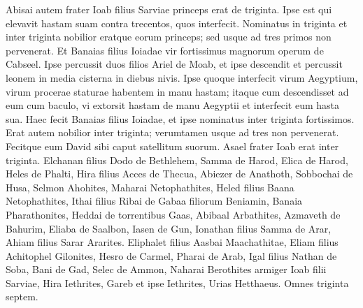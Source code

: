 \begin{biblechapter}
\begin{biblechapter}
\begin{biblechapter}
\begin{biblechapter}
\begin{biblechapter}
\begin{biblechapter}
\begin{biblechapter}
\begin{biblechapter}
\begin{biblechapter}
\begin{biblechapter}
\begin{biblechapter}
\begin{biblechapter}
\begin{biblechapter}
\begin{biblechapter}
\begin{biblechapter}
\begin{biblechapter}
\begin{biblechapter}
\begin{biblechapter}
\begin{biblechapter}
\begin{biblechapter}
\begin{biblechapter}
\begin{biblechapter}
\begin{biblechapter}
 \verse Abisai autem frater Ioab filius Sarviae princeps erat de triginta. Ipse est qui elevavit hastam suam contra trecentos, quos interfecit. Nominatus in triginta 
\verse et inter triginta nobilior eratque eorum princeps; sed usque ad tres primos non pervenerat.
 \verse Et Banaias filius Ioiadae vir fortissimus magnorum operum de Cabseel. Ipse percussit duos filios Ariel de Moab, et ipse descendit et percussit leonem in media cisterna in diebus nivis. 
\verse Ipse quoque interfecit virum Aegyptium, virum procerae staturae habentem in manu hastam; itaque cum descendisset ad eum cum baculo, vi extorsit hastam de manu Aegyptii et interfecit eum hasta sua. 
 \verse Haec fecit Banaias filius Ioiadae, et ipse nominatus inter triginta fortissimos. 
\verse Erat autem nobilior inter triginta; verumtamen usque ad tres non pervenerat. Fecitque eum David sibi caput satellitum suorum.
 \verse Asael frater Ioab erat inter triginta. Elchanan filius Dodo de Bethlehem, 
 \verse Samma de Harod, Elica de Harod, 
\verse Heles de Phalti, Hira filius Acces de Thecua, 
\verse Abiezer de Anathoth, Sobbochai de Husa, 
\verse Selmon Ahohites, Maharai Netophathites, 
\verse Heled filius Baana Netophathites, Ithai filius Ribai de Gabaa filiorum Beniamin, 
\verse Banaia Pharathonites, Heddai de torrentibus Gaas, 
\verse Abibaal Arbathites, Azmaveth de Bahurim, 
\verse Eliaba de Saalbon, Iasen de Gun, 
\verse Ionathan filius Samma de Arar, Ahiam filius Sarar Ararites. 
 \verse Eliphalet filius Aasbai Maachathitae, Eliam filius Achitophel Gilonites, 
 \verse Hesro de Carmel, Pharai de Arab, 
\verse Igal filius Nathan de Soba, Bani de Gad, 
\verse Selec de Ammon, Naharai Berothites armiger Ioab filii Sarviae, 
 \verse Hira Iethrites, Gareb et ipse Iethrites, 
\verse Urias Hetthaeus.
 Omnes triginta septem.
 

\end{biblechapter}
\end{biblechapter}
\end{biblechapter}
\end{biblechapter}
\end{biblechapter}
\end{biblechapter}
\end{biblechapter}
\end{biblechapter}
\end{biblechapter}
\end{biblechapter}
\end{biblechapter}
\end{biblechapter}
\end{biblechapter}
\end{biblechapter}
\end{biblechapter}
\end{biblechapter}
\end{biblechapter}
\end{biblechapter}
\end{biblechapter}
\end{biblechapter}
\end{biblechapter}
\end{biblechapter}
\end{biblechapter}
